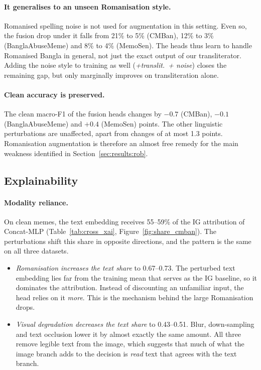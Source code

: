 \paragraph{It generalises to an unseen Romanisation style.} Romanised spelling noise is not used for augmentation in
this setting. Even so, the fusion drop under it falls from 21\% to 5\% (CMBan), 12\% to 3\% (BanglaAbuseMeme) and
8\% to 4\% (MemoSen). The heads thus learn to handle Romanised Bangla in general, not just the exact output of our
transliterator. Adding the noise style to training as well (\emph{+translit.\ + noise}) closes the remaining gap,
but only marginally improves on transliteration alone.

\paragraph{Clean accuracy is preserved.} The clean macro-F1 of the fusion heads changes by $-0.7$ (CMBan),
$-0.1$ (BanglaAbuseMeme) and $+0.4$ (MemoSen) points. The other linguistic perturbations are unaffected, apart
from changes of at most 1.3 points. Romanisation augmentation is therefore an almost free remedy for the main
weakness identified in Section~\ref{sec:results:rob}.

\subsection{Explainability}
\label{sec:results:xai}



\paragraph{Modality reliance.} On clean memes, the text embedding receives 55--59\% of the IG attribution of
Concat-MLP (Table~\ref{tab:cross_xai}, Figure~\ref{fig:share_cmban}). The perturbations shift this share in
opposite directions, and the pattern is the same on all three datasets.
\begin{itemize}
  \item \emph{Romanisation increases the text share} to 0.67--0.73. The perturbed text embedding lies far from the
  training mean that serves as the IG baseline, so it dominates the attribution. Instead of discounting an
  unfamiliar input, the head relies on it \emph{more}. This is the mechanism behind the large Romanisation drops.
  \item \emph{Visual degradation decreases the text share} to 0.43--0.51. Blur, down-sampling and text occlusion
  lower it by almost exactly the same amount. All three remove legible text from the image, which suggests that
  much of what the image branch adds to the decision is \emph{read} text that agrees with the text branch.
\end{itemize}

